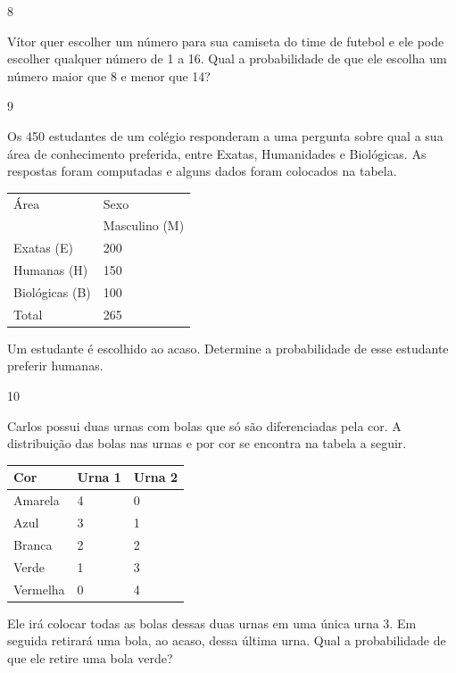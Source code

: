 \begin{multicols}{2}
{\begin{escolha}

\num{8}

Vítor quer escolher um número para sua camiseta do time de futebol e ele
pode escolher qualquer número de 1 a 16. Qual a probabilidade de que ele
escolha um número maior que 8 e menor que 14?


\num{9}

Os 450 estudantes de um colégio responderam a uma pergunta sobre qual a
sua área de conhecimento preferida, entre Exatas, Humanidades e
Biológicas. As respostas foram computadas e alguns dados foram colocados
na tabela.

\begin{longtable}[]{@{}ll@{}}
\toprule
Área & Sexo\tabularnewline
& Masculino (M)\tabularnewline
Exatas (E) & 200\tabularnewline
Humanas (H) & 150\tabularnewline
Biológicas (B) & 100\tabularnewline
Total & 265\tabularnewline
\bottomrule
\end{longtable}

Um estudante é escolhido ao acaso. Determine a probabilidade de esse
estudante preferir humanas.


\num{10}

Carlos possui duas urnas com bolas que só são diferenciadas pela cor. A
distribuição das bolas nas urnas e por cor se encontra na tabela a
seguir.

\begin{longtable}[]{@{}lll@{}}
\toprule
Cor & Urna 1 & Urna 2\tabularnewline
\midrule
\endhead
Amarela & 4 & 0\tabularnewline
Azul & 3 & 1\tabularnewline
Branca & 2 & 2\tabularnewline
Verde & 1 & 3\tabularnewline
Vermelha & 0 & 4\tabularnewline
\bottomrule
\end{longtable}

Ele irá colocar todas as bolas dessas duas urnas em uma única urna 3. Em
seguida retirará uma bola, ao acaso, dessa última urna. Qual a
probabilidade de que ele retire uma bola verde?



\end{escolha}}
\end{multicols}
